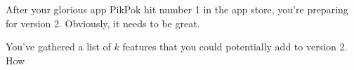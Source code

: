 \documentclass{article}
\begin{document}
 After your glorious app PikPok hit number 1 in the app store, you're
preparing for version 2.
Obviously, it needs to be great.

You've gathered a list of $k$ features  that you could potentially add to version 2.
How
\end{document}
